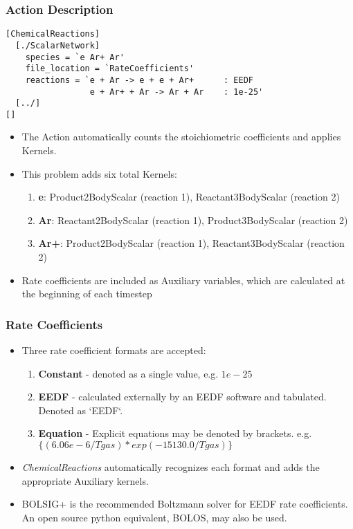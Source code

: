 	\begin{frame}[fragile]
		\frametitle{Action Description}
		\begin{Verbatim}[fontsize=\scriptsize]
[ChemicalReactions]
  [./ScalarNetwork]
    species = `e Ar+ Ar'
    file_location = `RateCoefficients'
    reactions = `e + Ar -> e + e + Ar+      : EEDF
                 e + Ar+ + Ar -> Ar + Ar    : 1e-25'
  [../]
[]
		\end{Verbatim}
			\begin{itemize}
				\item The Action automatically counts the stoichiometric coefficients and applies Kernels.
				\item This problem adds six total Kernels:
				\begin{enumerate}
					\item \textbf{e}: Product2BodyScalar (reaction 1), Reactant3BodyScalar (reaction 2)
					\item \textbf{Ar}: Reactant2BodyScalar (reaction 1), Product3BodyScalar (reaction 2)
					\item \textbf{Ar+}: Product2BodyScalar (reaction 1), Reactant3BodyScalar (reaction 2)
				\end{enumerate}
				\item Rate coefficients are included as Auxiliary variables, which are calculated at the beginning of each timestep
			\end{itemize}
	\end{frame}

	\begin{frame}[fragile]
		\frametitle{Rate Coefficients}
			\begin{itemize}
				\item Three rate coefficient formats are accepted:
				\begin{enumerate}
					\item \textbf{Constant} - denoted as a single value, e.g. $1e-25$
					\item \textbf{EEDF} - calculated externally by an EEDF software and tabulated. Denoted as `EEDF`.
					\item \textbf{Equation} - Explicit equations may be denoted by brackets. e.g. $\{(6.06e-6/Tgas)*exp(-15130.0/Tgas)\}$
				\end{enumerate}
				\item \textit{ChemicalReactions} automatically recognizes each format and adds the appropriate Auxiliary kernels.
				\item BOLSIG+ is the recommended Boltzmann solver for EEDF rate coefficients. An open source python equivalent, BOLOS, may also be used.
			\end{itemize}
	\end{frame}
	

